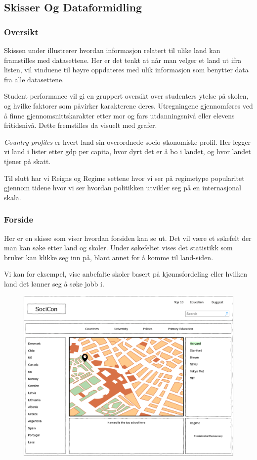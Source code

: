 \subsection{Skisser Og Dataformidling}
\subsubsection{Oversikt}
Skissen under illustrerer hvordan informasjon relatert til ulike land kan framstilles med datasettene. Her er det tenkt at når man velger et land ut ifra listen, vil vinduene til høyre oppdateres med ulik informasjon som benytter data fra alle datasettene.

Student performance vil gi en gruppert oversikt over studenters ytelse på skolen, og hvilke faktorer som påvirker karakterene deres. Utregningene gjennomføres ved å finne gjennomsnittskarakter etter mor og fars utdanningsnivå eller elevens fritidsnivå. Dette fremstilles da visuelt med grafer.

\textit{Country profiles} er hvert land sin overordnede socio-økonomiske profil. Her legger vi land i lister etter gdp per capita, hvor dyrt det er å bo i landet, og hvor landet tjener på skatt.

Til slutt har vi Reigns og Regime settene hvor vi ser på regimetype popularitet gjennom tidene hvor vi ser hvordan politikken utvikler seg på en internasjonal skala.

\subsubsection{Forside}
Her er en skisse som viser hvordan forsiden kan se ut. Det vil være et søkefelt der man kan søke etter land og skoler. Under søkefeltet vises det statistikk som bruker kan klikke seg inn på, blant annet for å komme til land-siden.

Vi kan for eksempel, vise anbefalte skoler basert på kjønnsfordeling eller hvilken land det lønner seg å søke jobb i.

\FigureCounter
\begin{figure}[H]
    \includegraphics[width=\textwidth]{images/milepael1/forsideBigdata.png}
\end{figure}

